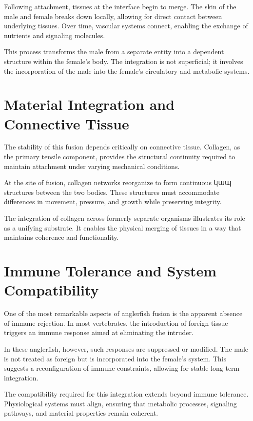 \documentclass[11pt,oneside]{book}
\begin{document}
Following attachment, tissues at the interface begin to merge. The skin of the male and female breaks down locally, allowing for direct contact between underlying tissues. Over time, vascular systems connect, enabling the exchange of nutrients and signaling molecules.

This process transforms the male from a separate entity into a dependent structure within the female’s body. The integration is not superficial; it involves the incorporation of the male into the female’s circulatory and metabolic systems.

\section{Material Integration and Connective Tissue}

The stability of this fusion depends critically on connective tissue. Collagen, as the primary tensile component, provides the structural continuity required to maintain attachment under varying mechanical conditions.

At the site of fusion, collagen networks reorganize to form continuous կապ structures between the two bodies. These structures must accommodate differences in movement, pressure, and growth while preserving integrity.

The integration of collagen across formerly separate organisms illustrates its role as a unifying substrate. It enables the physical merging of tissues in a way that maintains coherence and functionality.

\section{Immune Tolerance and System Compatibility}

One of the most remarkable aspects of anglerfish fusion is the apparent absence of immune rejection. In most vertebrates, the introduction of foreign tissue triggers an immune response aimed at eliminating the intruder.

In these anglerfish, however, such responses are suppressed or modified. The male is not treated as foreign but is incorporated into the female’s system. This suggests a reconfiguration of immune constraints, allowing for stable long-term integration.

The compatibility required for this integration extends beyond immune tolerance. Physiological systems must align, ensuring that metabolic processes, signaling pathways, and material properties remain coherent.
\end{document}
